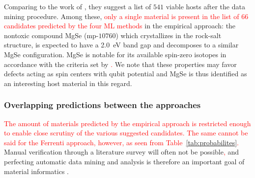 \documentclass[superscriptaddress,unsortedaddress,
 amsmath,amssymb,
 aps,
]{revtex4-2}
\newcommand{\mrk}[1]{\textcolor{red}{#1}}
\begin{document}
Comparing to the work of \citeauthor{Ferrenti2020} \cite{Ferrenti2020}, they suggest a list of $541$ viable hosts after the data mining procedure.  
Among these, \mrk{only a single material is present in the list of $66$ candidates predicted by the four ML methods} in the empirical approach: the nontoxic compound MgSe (mp-$10760$) which crystallizes in the rock-salt structure, is expected to have a \SI{2.0}{\electronvolt} band gap and decomposes to a similar MgSe configuration. 
MgSe is notable for its available spin-zero isotopes in accordance with the criteria set by \citeauthor{Weber2010} \cite{Weber2010}\mrk{.}  
We note that these properties may favor defects acting as spin centers with qubit potential and MgSe is thus identified as an interesting host material in this regard.   

\subsubsection*{Overlapping predictions between the approaches}

\mrk{The amount of materials predicted by the empirical approach is restricted enough to enable close scrutiny of the various suggested candidates. The same cannot be said for the Ferrenti approach, however, as seen from Table~\ref{tab:probabilites}.} Manual verification through a literature survey will often not be possible\mrk{,} and perfecting automatic data mining and analysis is therefore an important goal of material informatics \cite{rickman2019}. 
\end{document}
